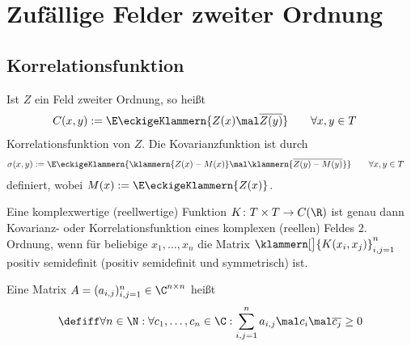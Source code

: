 
\chapter{Zufällige Felder zweiter Ordnung}
\section{Korrelationsfunktion}

\begin{erinnerungnr}\label{erinnerung3.1.1}
	Ist $Z$ ein Feld zweiter Ordnung, so heißt
	\begin{align*}
		C(x,y)
		&:=\E\eckigeKlammern{Z(x)\mal\overline{Z(y)}} \qquad\forall x,y\in T
	\end{align*}
	Korrelationsfunktion von $Z$. 
	Die Kovarianzfunktion ist durch 
	\begin{align*}
		\sigma(x,y)&:=\E\eckigeKlammern{\klammern{Z(x)-M(x)}\mal\klammern{\overline{Z(y)-M(y)}}}
		\qquad\forall x,y\in T
	\end{align*}
	definiert, wobei
	$M(x):=\E\eckigeKlammern{Z(x)}$.
\end{erinnerungnr}

\begin{satz}\label{satz3.1.2}
	Eine komplexwertige (reellwertige) Funktion $K\colon T\times T\to C(\R)$ ist genau dann Kovarianz- oder Korrelationsfunktion eines komplexen (reellen) Feldes 2. Ordnung, wenn für beliebige $x_1,\ldots,x_n$ die Matrix $\klammern[\big]{K(x_i,x_j)}_{i,j=1}^n$ positiv semidefinit (positiv semidefinit und symmetrisch) ist.
\end{satz}

\begin{erinnerung}
	 Eine Matrix $A=(a_{i,j})_{i,j=1}^n\in\C^{n\times n}$ heißt 
	 \begin{align*}
	 	\defiff\forall n\in\N:\forall c_1,\ldots,c_n\in\C:\sum\limits_{i,j=1}^n a_{i,j}\mal c_i\mal\overline{c_j}\geq 0
	 \end{align*}
\end{erinnerung}

